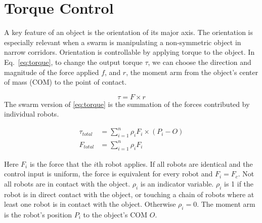 \section{Torque Control}
\label{sec:theory}

A key feature of an object is the orientation of its major axis. 
The orientation is especially relevant when a swarm is manipulating a non-symmetric object in narrow corridors. 
Orientation is controllable by applying torque to the object. 
In Eq.~\ref{eq:torque},  to change the output torque $\tau$, we can choose the direction and magnitude of the force applied $f$, and $r$, the moment arm from the object's center of mass (COM) to the point of contact.

\begin{equation}
\tau = F \times r\label{eq:torque}
\end{equation}
The swarm version of \eqref{eq:torque} is the summation of the forces contributed by individual robots.

\begin{align}
\tau_{total} &= \sum\limits_{i=1}^n \rho_i F_i \times (P_i - O )   \label{eq:swarmtorque}\\
F_{total} &= \sum\limits_{i=1}^n \rho_i F_i  \label{eq:swarmforce}
\end{align}

Here $F_i$ is the force that the $i$th robot applies.  If all robots are identical and the control input is uniform, the force is equivalent for every robot and $F_i = F_c$.
Not all robots are in contact with the object.  $\rho_i$ is an indicator variable.   $\rho_i$ is 1 if the robot is in direct contact with the object, or touching a chain of robots where at least one robot is in contact with the object. Otherwise $\rho_i = 0$.
The moment arm is the robot's position $P_i$ to the object's COM $O$.




